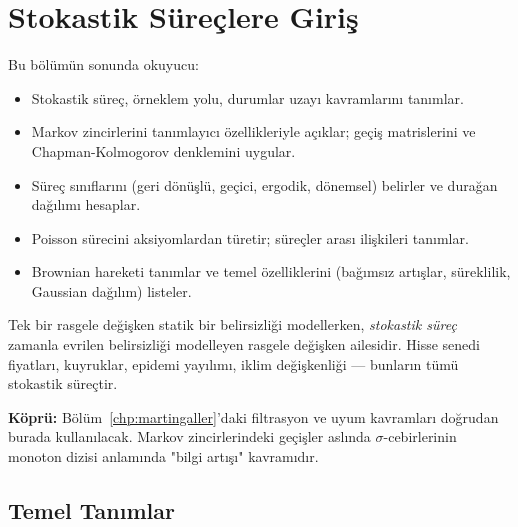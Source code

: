 \chapter{Stokastik Süreçlere Giriş}
\label{chp:stokastik}


\begin{kazanimlar}
Bu bölümün sonunda okuyucu:
\begin{itemize}
  \item Stokastik süreç, örneklem yolu, durumlar uzayı kavramlarını tanımlar.
  \item Markov zincirlerini tanımlayıcı özellikleriyle açıklar; geçiş matrislerini ve Chapman-Kolmogorov denklemini uygular.
  \item Süreç sınıflarını (geri dönüşlü, geçici, ergodik, dönemsel) belirler ve durağan dağılımı hesaplar.
  \item Poisson sürecini aksiyomlardan türetir; süreçler arası ilişkileri tanımlar.
  \item Brownian hareketi tanımlar ve temel özelliklerini (bağımsız artışlar, süreklilik, Gaussian dağılım) listeler.
\end{itemize}
\end{kazanimlar}

\begin{motivasyon}
Tek bir rasgele değişken statik bir belirsizliği modellerken, \emph{stokastik süreç} zamanla evrilen belirsizliği modelleyen rasgele değişken ailesidir. Hisse senedi fiyatları, kuyruklar, epidemi yayılımı, iklim değişkenliği --- bunların tümü stokastik süreçtir.

\medskip
\noindent\textbf{Köprü:} Bölüm~\ref{chp:martingaller}'daki filtrasyon ve uyum kavramları doğrudan burada kullanılacak. Markov zincirlerindeki geçişler aslında $\sigma$-cebirlerinin monoton dizisi anlamında "bilgi artışı" kavramıdır.
\end{motivasyon}

\section{Temel Tanımlar}
\label{sec:stokastik_temel}

